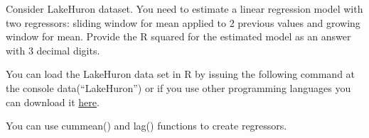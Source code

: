 
\begin{question}
Consider LakeHuron dataset. You need to estimate a linear regression model with two regressors: sliding window for mean applied to 2 previous values and growing window for mean. Provide the R squared for the estimated model as an answer with 3 decimal digits.

You can load the LakeHuron data set in R by issuing the following command at the console data(``LakeHuron'') or if you use other programming languages you can download it \href{https://github.com/vincentarelbundock/Rdatasets/blob/master/csv/datasets/LakeHuron.csv}{here}.
\end{question}

\begin{solution}
You can use cummean() and lag() functions to create regressors.
\end{solution}

